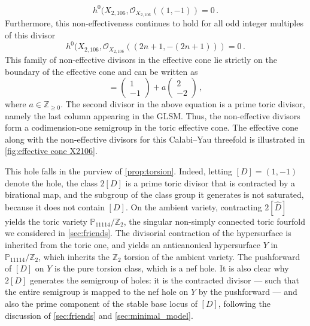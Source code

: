 \documentclass[11pt,dvipsnames]{article}
\theoremstyle{definition}
\begin{document}
\begin{equation}
    h^0(X_{2,106},\mathcal{O}_{X_{2,106}}((1,-1))=0\,.
\end{equation}
Furthermore, this non-effectiveness continues to hold for all odd integer multiples of this divisor
\begin{equation}
    h^0(X_{2,106},\mathcal{O}_{X_{2,106}}((2n+1,-(2n+1)))=0\,.
\end{equation}
This family of non-effective divisors in the effective cone lie strictly on the boundary of the effective cone and can be written as 
\begin{equation}
    [D_a] =
    \begin{pmatrix}
        1\\
        -1
    \end{pmatrix}
    +a
    \begin{pmatrix}
        2\\
        -2
    \end{pmatrix}\,,
\end{equation}
where $a\in\mathbb{Z}_{\geq 0}$. The second divisor in the above equation is a prime toric divisor, namely the last column appearing in the GLSM. Thus, the non-effective divisors form a codimension-one semigroup in the toric effective cone. The effective cone along with the non-effective divisors for this Calabi--Yau threefold is illustrated in \cref{fig:effective cone X2106}.

This hole falls in the purview of \cref{prop:torsion}. Indeed, letting $[D] = (1, -1)$ denote the hole, the class $2[D]$ is a prime toric divisor that is contracted by a birational map, and the subgroup of the class group it generates is not saturated, because it does not contain $[D]$. On the ambient variety, contracting $2[\hat{D}]$ yields the toric variety $\mathbb{P}_{11114}/\mathbb{Z}_2$, the singular non-simply connected toric fourfold we considered in \cref{sec:friends}. The divisorial contraction of the hypersurface is inherited from the toric one, and yields an anticanonical hypersurface $Y$ in $\mathbb{P}_{11114}/\mathbb{Z}_2$, which inherits the $\mathbb{Z}_2$ torsion of the ambient variety. The pushforward of $[D]$ on $Y$ is the pure torsion class, which is a nef hole. It is also clear why $2[D]$ generates the semigroup of holes: it is the contracted divisor --- such that the entire semigroup is mapped to the nef hole on $Y$ by the pushforward --- and also the prime component of the stable base locus of $[D]$, following the discussion of \cref{sec:friends} and \cref{sec:minimal_model}.
\end{document}
